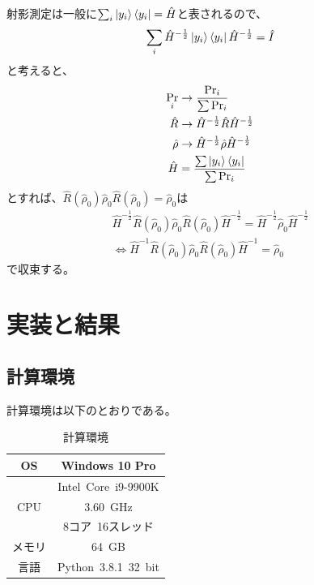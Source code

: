 \documentclass[11pt,a4j,notitlepage]{jreport}
\begin{document}
	射影測定は一般に$\sum_i \ket{y_i} \bra{y_i} = \hat{H}$と表されるので、
	\begin{equation}
		\sum_i \hat{H}^{- \frac{1}{2}} \ket{y_i} \bra{y_i} \hat{H}^{- \frac{1}{2}} = \hat{I}
	\end{equation}
	と考えると、
	\begin{equation*}
		\begin{aligned}
			\Pr_i &\to \frac{\Pr_i}{\sum \Pr_i} \\
			\hat{R} &\to \hat{H}^{- \frac{1}{2}} \hat{R} \hat{H}^{- \frac{1}{2}} \\
			\hat{\rho} &\to \hat{H}^{- \frac{1}{2}} \hat{\rho} \hat{H}^{- \frac{1}{2}} \\
			\hat{H} &= \frac{\sum \ket{y_i} \bra{y_i}}{\sum \Pr_i}
		\end{aligned}
	\end{equation*}
	とすれば、$\hat{R} (\hat{\rho}_0) \hat{\rho}_0 \hat{R} (\hat{\rho}_0) = \hat{\rho}_0$は
	\begin{equation}
		\begin{aligned}
			\hat{H}^{- \frac{1}{2}} \hat{R} (\hat{\rho}_0) \hat{\rho}_0 \hat{R} (\hat{\rho}_0) \hat{H}^{- \frac{1}{2}} = \hat{H}^{- \frac{1}{2}} \hat{\rho}_0 \hat{H}^{- \frac{1}{2}} \\
			\Longleftrightarrow \hat{H}^{-1} \hat{R} (\hat{\rho}_0) \hat{\rho}_0 \hat{R} (\hat{\rho}_0) \hat{H}^{-1} = \hat{\rho}_0
		\end{aligned}
	\end{equation}
	で収束する。

	\chapter{実装と結果}

	\section{計算環境}

	計算環境は以下のとおりである。

	\begin{table}[h]
		\centering
			\caption{計算環境}
			\begin{tabular}{|c|c|}
				\hline
				OS & Windows 10 Pro \\ \hline
				& Intel\ Core\ i9-9900K \\
				CPU & 3.60\ GHz \\
				& 8コア\ 16スレッド　\\ \hline
				メモリ & 64\ GB \\ \hline
				言語 & Python\ 3.8.1\ 32\ bit \\ \hline
			\end{tabular}
	\end{table}
\end{document}
